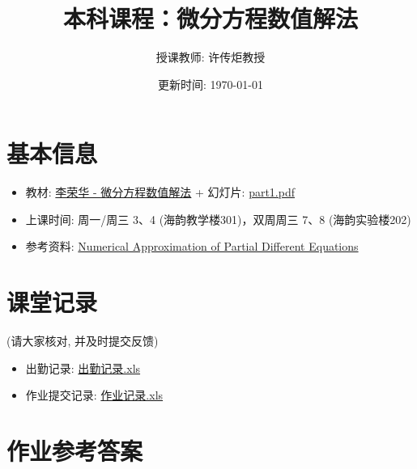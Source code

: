 \documentclass[a4paper,11pt]{article}
\title{本科课程：微分方程数值解法}
\author{授课教师: 许传炬教授}
\date{更新时间: \today}
\begin{document}
\maketitle

\vspace{-3em}

\section*{\large 基本信息}
\vspace{-1em}

\begin{itemize}
\item 教材: \href{https://wanghuaijin.github.io/assets/numDEs/LiRonghua.pdf}{李荣华 - 微分方程数值解法} + 幻灯片: \href{https://wanghuaijin.github.io/assets/numDEs/part1.pdf}{part1.pdf}
\vspace{-1em}
\item 上课时间: 周一/周三 3、4 (海韵教学楼301)，双周周三 7、8 (海韵实验楼202)
\vspace{-1em}
\item 参考资料: \href{https://wanghuaijin.github.io/assets/numDEs/Alfio1994.pdf}{Numerical Approximation of Partial Different Equations}
\end{itemize}

\vspace{-2em}

\section*{\large 课堂记录}
\vspace{-1em}

(请大家核对, 并及时提交反馈)

\vspace{-1em}
\begin{itemize}
\item 出勤记录: \href{https://wanghuaijin.github.io/assets/numDEs/status/2024-2025_2_0_19020240157508.xls}{出勤记录.xls}
\vspace{-1em}
\item 作业提交记录: \href{https://wanghuaijin.github.io/assets/numDEs/status/homework.xls}{作业记录.xls}
\end{itemize}



\vspace{-2em}

\section*{\large 作业参考答案}
\vspace{-1em}
\end{document}
